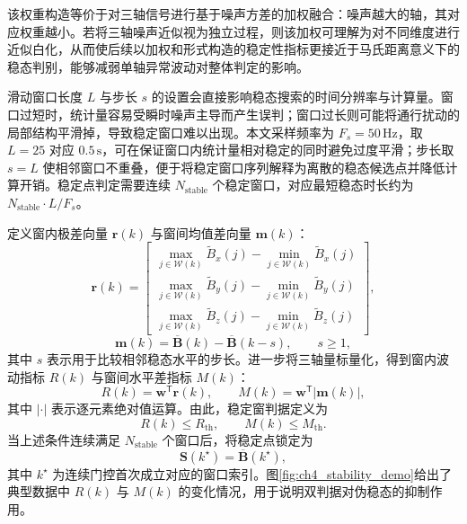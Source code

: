 \documentclass{xdupgthesis}
\begin{document}
该权重构造等价于对三轴信号进行基于噪声方差的加权融合：噪声越大的轴，其对应权重越小。若将三轴噪声近似视为独立过程，则该加权可理解为对不同维度进行近似白化，从而使后续以加权和形式构造的稳定性指标更接近于马氏距离意义下的稳态判别，能够减弱单轴异常波动对整体判定的影响。

滑动窗口长度 $L$ 与步长 $s$ 的设置会直接影响稳态搜索的时间分辨率与计算量。窗口过短时，统计量容易受瞬时噪声主导而产生误判；窗口过长则可能将通行扰动的局部结构平滑掉，导致稳定窗口难以出现。本文采样频率为 $F_s=50\,\mathrm{Hz}$，取 $L=25$ 对应 $0.5\,\mathrm{s}$，可在保证窗口内统计量相对稳定的同时避免过度平滑；步长取 $s=L$ 使相邻窗口不重叠，便于将稳定窗口序列解释为离散的稳态候选点并降低计算开销。稳定点判定需要连续 $N_{\mathrm{stable}}$ 个稳定窗口，对应最短稳态时长约为 $N_{\mathrm{stable}}\cdot L/F_s$。

定义窗内极差向量 $\mathbf{r}(k)$ 与窗间均值差向量 $\mathbf{m}(k)$：
\begin{equation}
    \mathbf{r}(k)=\begin{bmatrix}
        \max\limits_{j\in\mathcal{W}(k)}\widetilde{B}_x(j)-\min\limits_{j\in\mathcal{W}(k)}\widetilde{B}_x(j)\\
        \max\limits_{j\in\mathcal{W}(k)}\widetilde{B}_y(j)-\min\limits_{j\in\mathcal{W}(k)}\widetilde{B}_y(j)\\
        \max\limits_{j\in\mathcal{W}(k)}\widetilde{B}_z(j)-\min\limits_{j\in\mathcal{W}(k)}\widetilde{B}_z(j)
    \end{bmatrix},
\end{equation}
\begin{equation}
    \mathbf{m}(k)=\overline{\mathbf{B}}(k)-\overline{\mathbf{B}}(k-s),\qquad s\ge 1,
\end{equation}
其中 $s$ 表示用于比较相邻稳态水平的步长。进一步将三轴量标量化，得到窗内波动指标 $R(k)$ 与窗间水平差指标 $M(k)$：
\begin{equation}
    R(k)=\mathbf{w}^{\mathsf{T}}\mathbf{r}(k),\qquad M(k)=\mathbf{w}^{\mathsf{T}}\left|\mathbf{m}(k)\right|,
\end{equation}
其中 $|\cdot|$ 表示逐元素绝对值运算。由此，稳定窗判据定义为
\begin{equation}
    R(k)\le R_{\mathrm{th}},\qquad M(k)\le M_{\mathrm{th}}.
    \label{eq:ch4_stable_cond}
\end{equation}
当上述条件连续满足 $N_{\mathrm{stable}}$ 个窗口后，将稳定点锁定为
\begin{equation}
    \mathbf{S}(k^{\star})=\overline{\mathbf{B}}(k^{\star}),
\end{equation}
其中 $k^{\star}$ 为连续门控首次成立对应的窗口索引。图\ref{fig:ch4_stability_demo}给出了典型数据中 $R(k)$ 与 $M(k)$ 的变化情况，用于说明双判据对伪稳态的抑制作用。
\end{document}
